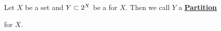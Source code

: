 \newcommand{\Partition}[0]{
    \bf \hyperref[def:Partition]{Partition} \rm
}
\newcommand{\Partitions}[0]{
    \bf \hyperref[def:Partition]{Partitions} \rm
}\begin{df}[Partition]
\label{def:Partition}
\rm
    Let $X$ be a set and 
    $Y \subset 2^{X}$ 
    be a \Disjoint \Cover for $X$. 
    Then we call $Y$ a \Partition
    for $X$. 
\end{df}
